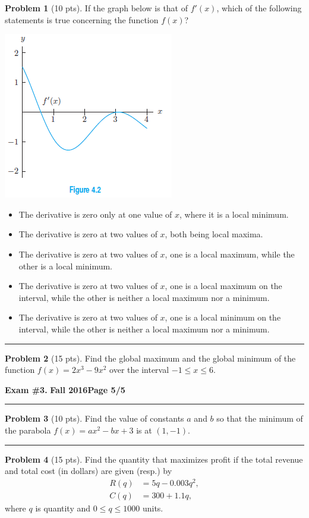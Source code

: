 \documentclass[12pt]{article}
\makeatletter
\theoremstyle{definition}
\newtheorem{problem}{Problem}
\newcommand*{\radiobutton}{%
  \@ifstar{\@radiobutton0}{\@radiobutton1}%
}
\newcommand*{\@radiobutton}[1]{%
  \begin{tikzpicture}
    \pgfmathsetlengthmacro\radius{height("X")/2}
    \draw[radius=\radius] circle;
    \ifcase#1 \fill[radius=.6*\radius] circle;\fi
  \end{tikzpicture}%
}
\makeatother
\begin{document}
\begin{problem}[10 pts]
If the graph below is that of $f'(x)$, which of the following statements is true concerning the function $f(x)$?
\begin{center}
\includegraphics{3graph2}
\end{center}
\begin{itemize}
\item[\radiobutton] The derivative is zero only at one value of $x$, where it is a local minimum.
\item[\radiobutton] The derivative is zero at two values of $x$, both being local maxima.
\item[\radiobutton] The derivative is zero at two values of $x$, one is a local maximum, while the other is a local minimum.
\item[\radiobutton] The derivative is zero at two values of $x$, one is a local maximum on the interval, while the other is neither a local maximum nor a minimum.
\item[\radiobutton] The derivative is zero at two values of $x$, one is a local minimum on the interval, while the other is neither a local maximum nor a minimum.
\end{itemize}
\end{problem}

\hrule
\begin{problem}[15 pts]
Find the global maximum and the global minimum of the function $f(x) = 2x^3 - 9x^2$ over the interval $-1 \leq x \leq 6$.
\end{problem}
\newpage

\hfill{\large\bf Exam \#3.}\hfill{\large\bf
  Fall 2016}\hfill{\large\bf Page 5/5}\hrule

\bigskip
\begin{problem}[10 pts]
Find the value of constants $a$ and $b$ so that the minimum of the parabola $f(x) = ax^2 -bx +3$ is at $(1,-1)$.

\vspace{7cm}
\end{problem}
\hrule
\begin{problem}[15 pts]
Find the quantity that maximizes profit if the total revenue and total cost (in dollars) are given (resp.) by 
\begin{align*}
R(q) &= 5q - 0.003q^2, \\
C(q) &= 300 + 1.1q,
\end{align*}
where $q$ is quantity and $0 \leq q \leq 1000$ units.  
\end{problem}
\end{document}
